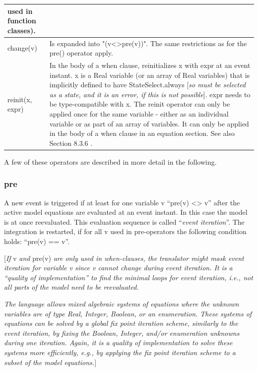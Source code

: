 \documentclass[10pt,a4paper]{report}
\def\Mcomment#1{{[}\emph{#1}{]}}
\def\doublelabel#1{\label{#1}\hypertarget{#1}{}}
\begin{document}
\begin{longtable}{|p{3.2cm}|p{8cm}|}
used in function classes).\\ \hline
change(v) & Is expanded into "(v\textless{}\textgreater{}pre(v))". The
same restrictions as for the pre() operator apply.\\ \hline
reinit(x, expr) & In the body of a when clause, reinitializes x with
expr at an event instant. x is a Real variable (or an array of Real
variables) that is implicitly defined to have StateSelect.always
\Mcomment{so must be selected as a state, and it is an error, if
this is not possible}. expr needs to be type-compatible with x. The
reinit operator can only be applied once for the same variable - either
as an individual variable or as part of an array of variables. It can
only be applied in the body of a when clause in an equation section. See
also Section 8.3.6 .\\ \hline

\end{longtable}

A few of these operators are described in more detail in the following.

\subsubsection{pre}\doublelabel{pre}

A new event is triggered if at least for one variable v ``pre(v)
\textless{}\textgreater{} v'' after the active model equations are
evaluated at an event instant. In this case the model is at once
reevaluated. This evaluation sequence is called ``\emph{event
iteration}''. The integration is restarted, if for all v used in
pre-operators the following condition holds: ``pre(v) == v''.

{[}\emph{If} v \emph{and} pre(v) \emph{are only used in when-clauses,
the translator might mask event iteration for variable v since v cannot
change during event iteration. It is a ``quality of implementation'' to
find the minimal loops for event iteration, i.e., not all parts of the
model need to be reevaluated. }

\emph{The language allows mixed algebraic systems of equations where the
unknown variables are of type Real, Integer, Boolean, or an enumeration.
These systems of equations can be solved by a global fix point iteration
scheme, similarly to the event iteration, by fixing the Boolean,
Integer, and/or enumeration unknowns during one iteration. Again, it is
a quality of implementation to solve these systems more efficiently,
e.g., by applying the fix point iteration scheme to a subset of the
model equations.}{]}
\end{document}
